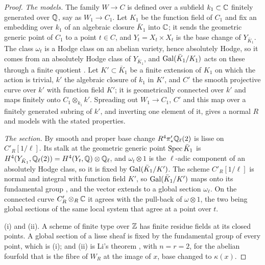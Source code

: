 \begin{proof}
\emph{The models.} The family $W\to C$ is defined over a subfield
$k_{1}\subset\mathbb{C}$ finitely generated over $\mathbb{Q}$, say as $W_{1}\to C_{1}$. Let
$K_{1}$ be the function field of $C_{1}$ and fix an embedding over $k_{1}$ of
an algebraic closure $\bar{K}_{1}$ into $\mathbb{C}$; it sends the geometric generic
point of $C_{1}$ to a point $t\in C$, and $Y_{t}=X_{t}\times X_{t}$ is the base
change of $Y_{\bar{K}_{1}}$. The class $\omega_{t}$ is a Hodge class on an
abelian variety, hence absolutely Hodge, so it comes from an absolutely Hodge
class of $Y_{\bar{K}_{1}}$, and $\operatorname{Gal}(\bar{K}_{1}/K_{1})$ acts on these
through a finite quotient \cite[Theorem~2.11 and Proposition~2.9]{Del82}. Let
$K'\subset\bar{K}_{1}$ be a finite extension of $K_{1}$ on which the action is
trivial, $k'$ the algebraic closure of $k_{1}$ in $K'$, and $C'$ the smooth
projective curve over $k'$ with function field $K'$; it is geometrically
connected over $k'$ and maps finitely onto $C_{1}\otimes_{k_{1}}k'$.
Spreading out $W_{1}\to C_{1}$, $C'$ and this map over a finitely generated
subring of $k'$, and inverting one element of it, gives a normal $R$ and
models with the stated properties.

\emph{The section.} By smooth and proper base change
$R^{4}\pi'_{*}\mathbb{Q}_{\ell}(2)$ is lisse on $C'_{R}[1/\ell]$. Its stalk at the
geometric generic point $\operatorname{Spec}\bar{K}_{1}$ is $H^{4}(Y_{\bar{K}_{1}},
\mathbb{Q}_{\ell}(2))=H^{4}(Y_{t},\mathbb{Q})\otimes\mathbb{Q}_{\ell}$, and $\omega_{t}\otimes1$
is the $\ell$-adic component of an absolutely Hodge class, so it is fixed by
$\operatorname{Gal}(\bar{K}_{1}/K')$. The scheme $C'_{R}[1/\ell]$ is normal and integral
with function field $K'$, so $\operatorname{Gal}(\bar{K}_{1}/K')$ maps onto its fundamental
group \cite[Tag~0BQI]{Stacks}, and the vector extends to a global section
$\omega_{\ell}$. On the connected curve $C'_{R}\otimes_{R}\mathbb{C}$ it agrees with
the pull-back of $\omega\otimes1$, the two being global sections of the same
local system that agree at a point over $t$.

(i) and (ii). A scheme of finite type over $\mathbb{Z}$ has finite residue fields at
its closed points. A global section of a lisse sheaf is fixed by the
fundamental group of every point, which is (i); and (ii) is Li's theorem
\cite[Theorem~1.1]{Li26}, with $n=r=2$, for the abelian fourfold that is the
fibre of $W_{R}$ at the image of $x$, base changed to $\kappa(x)$.


\end{proof}
